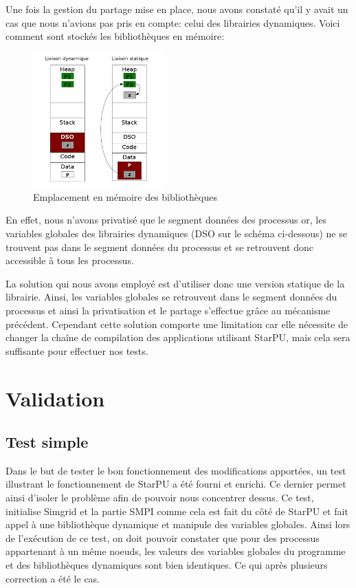 \documentclass[smallextended]{svjour3}
\begin{document}
Une fois la gestion du partage mise en place, nous avons constaté
qu'il y avait un cas que nous n'avions pas pris en compte: celui des
librairies dynamiques. Voici comment sont stockés les bibliothèques
en mémoire:

\begin{figure}[htb]
\centering
\includegraphics[width=5cm]{./Img/StaticDyn.jpg}
\caption{\label{fig:2}Emplacement en mémoire des bibliothèques}
\end{figure}

En effet, nous n'avons privatisé que le segment données des
processus or, les variables globales des librairies dynamiques (DSO
sur le schéma ci-dessous) ne se trouvent pas dans le segment données
du processus et se retrouvent donc accessible à tous les processus. 

La solution qui nous avons employé est d'utiliser donc une version
statique de la librairie. Ainsi, les variables globales se
retrouvent dans le segment données du processus et ainsi la
privatisation et le partage s'effectue grâce au mécanisme
précédent. Cependant cette solution comporte une limitation car elle
nécessite de changer la chaîne de compilation des applications
utilisant StarPU, mais cela sera suffisante pour effectuer nos tests. 

\section{Validation}
\label{sec-6}
\subsection{Test simple}
\label{sec-6-1}
Dans le but de tester le bon fonctionnement des modifications
apportées, un test illustrant le fonctionnement de StarPU a été
fourni et enrichi. Ce dernier permet ainsi d'isoler le problème
afin de pouvoir nous concentrer dessus. Ce test, initialise Simgrid
et la partie SMPI comme cela est fait du côté de StarPU et fait
appel à une bibliothèque dynamique et manipule des variables
globales. Ainsi lors de l'exécution de ce test, on doit pouvoir
constater que pour des processus appartenant à un même noeuds, les
valeurs des variables globales du programme et des bibliothèques
dynamiques sont bien identiques. Ce qui après plusieurs correction
a été le cas.  
\end{document}
